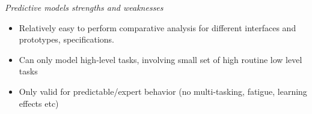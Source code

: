 \columnbreak

\textit{Predictive models strengths and weaknesses} \medskip


\begin{itemize}
    \item Relatively easy to perform comparative analysis for different interfaces and prototypes, specifications. 
    \item Can only model high-level tasks, involving small set of high routine low level tasks
    \item Only valid for predictable/expert behavior (no multi-tasking, fatigue, learning effects etc)
\end{itemize}



